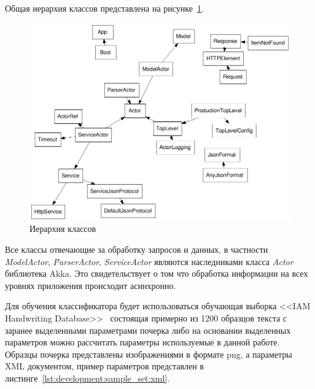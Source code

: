 



Общая иерархия классов представлена на рисунке~\ref{fig:develoipment:class_fdp}.
\begin{figure}[ht]
    \centering
    \includegraphics[width=1\textwidth]{figures/classes-fdp.png}
    \caption{Иерархия классов}
    \label{fig:develoipment:class_fdp}
\end{figure}

Все классы отвечающие за обработку запросов и данных, в частности \emph{ModelActor}, \emph{ParserActor}, \emph{ServiceActor} являются наследниками класса \emph{Actor} библиотека Akka. Это свидетельствует о том что обработка информации на всех уровнях приложения происходит асинхронно.

Для обучения классификатора будет использоваться обучающая выборка <<IAM Handwriting Database>>~\cite{IAM_handwriting_database} состоящая примерно из 1200 образцов текста с заранее выделенными параметрами почерка либо на основании выделенных параметров можно рассчитать параметры используемые в данной работе. Образцы почерка представлены изображениями в формате png, а параметры XML документом, пример параметров представлен в листинге~\ref{lst:development:sample_set:xml}. 
